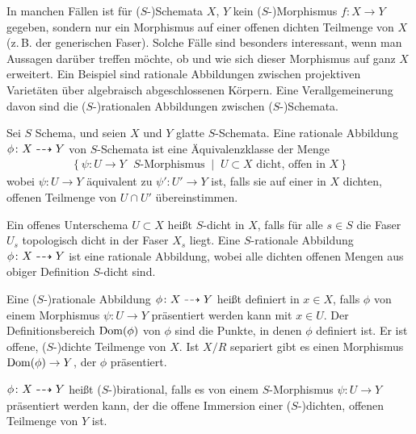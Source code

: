 In manchen Fällen ist für ($S$-)Schemata $X$, $Y$ kein
($S$-)Morphismus $f\colon X\to Y$ gegeben, sondern nur ein Morphismus
auf einer offenen dichten Teilmenge von $X$ (z.\,B. der generischen
Faser). Solche Fälle sind besonders interessant, wenn man Aussagen
darüber treffen möchte, ob und wie sich dieser Morphismus auf ganz $X$
erweitert. Ein Beispiel sind rationale Abbildungen zwischen
projektiven Varietäten über algebraisch abgeschlossenen Körpern.
Eine Verallgemeinerung davon sind die ($S$-)rationalen Abbildungen
zwischen ($S$-)Schemata.
\begin{Definition}\label{def:ratabb}
  Sei $S$ Schema, und seien $X$ und $Y$ glatte $S$-Schemata.
  Eine rationale Abbildung $\phi\colon X\dashrightarrow Y$ von
  $S$-Schemata ist eine Äquivalenzklasse der Menge
  \begin{gather*}
    \left\{
      \psi\colon U\to Y \text{ $S$-Morphismus}
      \;\middle|\;
      U\subset X \text{ dicht, offen in $X$}
    \right\}
  \end{gather*}
  wobei $\psi\colon U\to Y$ äquivalent zu $\psi'\colon U'\to Y$ ist,
  falls sie auf einer in $X$ dichten, offenen Teilmenge von $U\cap U'$
  übereinstimmen.
  
  Ein offenes Unterschema $U\subset X$ heißt $S$-dicht in $X$,
  falls für alle $s\in S$ die Faser $U_s$ %
  topologisch dicht in der Faser $X_s$ %
  liegt.
  Eine $S$-rationale Abbildung $\phi\colon X\dashrightarrow Y$ ist eine
  rationale Abbildung, wobei alle dichten offenen Mengen aus obiger
  Definition $S$-dicht sind.

  Eine ($S$-)rationale Abbildung $\phi\colon X\dashrightarrow Y$ heißt definiert
  in $x\in X$, falls $\phi$ von einem Morphismus $\psi\colon U\to Y$
  präsentiert werden kann mit $x\in U$.
  Der Definitionsbereich $\operatorname{Dom}(\phi)$ von $\phi$ sind die
  Punkte, in denen $\phi$ definiert ist. Er ist offene, ($S$-)dichte
  Teilmenge von $X$. Ist $X/R$ separiert gibt es einen Morphismus
  $\operatorname{Dom}(\phi)\to Y$, der $\phi$ präsentiert.
  
  $\phi\colon X\dashrightarrow Y$ heißt ($S$-)birational, falls es von einem
  $S$-Morphismus $\psi\colon U\to Y$ präsentiert werden kann, der
  die offene Immersion einer ($S$-)dichten, offenen Teilmenge von $Y$
  ist.
\end{Definition}

